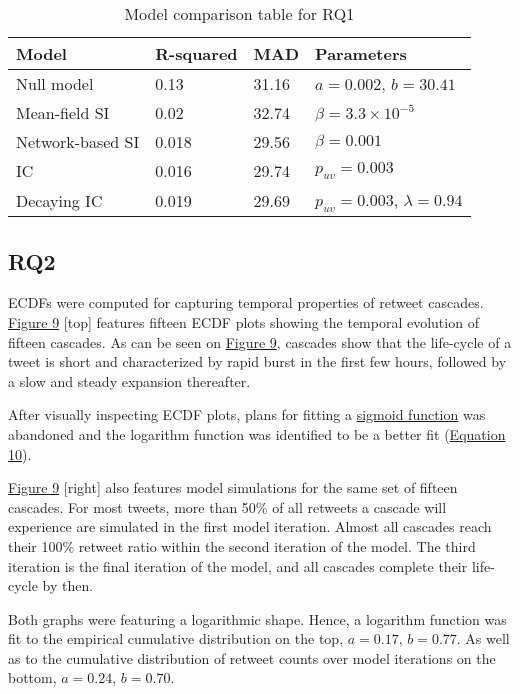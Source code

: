 \documentclass[11pt,a4paper]{article}
\begin{document}
    \begin{table}[H]
        \hypertarget{tab:comp}{}
      \centering
      \begin{tabular}{|l|l|l|l|}
        \hline
        \textbf{Model} & \textbf{R-squared} & \textbf{MAD}  & \textbf{Parameters} \\
        \hline
        Null model    & 0.13 & 31.16 & $a = 0.002$, $b = 30.41$  \\
        Mean-field SI & 0.02 & 32.74 & $\beta = 3.3 \times 10^{-5}$ \\
        Network-based SI & 0.018 & 29.56 & $\beta=0.001$ \\
        IC               & 0.016 & 29.74 & $p_{uv} = 0.003$  \\
        Decaying IC      & 0.019 & 29.69 & $p_{uv} = 0.003$, $\lambda = 0.94 $ \\
        \hline
      \end{tabular}
      \caption{Model comparison table for RQ1}
      \label{tab:mytable}
    \end{table}

    \subsection{RQ2}
    ECDFs were computed for capturing temporal properties of retweet cascades. \hyperlink{fig:ecdf-vs-iter}{Figure 9} [top] features fifteen ECDF plots showing the temporal evolution of fifteen cascades. As can be seen on \hyperlink{fig:ecdf-vs-iter}{Figure 9}, cascades show that the life-cycle of a tweet is short and characterized by rapid burst in the first few hours, followed by a slow and steady expansion thereafter.
    
    After visually inspecting ECDF plots, plans for fitting a \hyperlink{sec:sigmoid}{sigmoid function} was abandoned and the logarithm function was identified to be a better fit (\hyperlink{eq:avrami}{Equation 10}). 
    
    \hyperlink{fig:ecdf-vs-iter}{Figure 9} [right] also features model simulations for the same set of fifteen cascades. For most tweets, more than 50\% of all retweets a cascade will experience are simulated in the first model iteration. Almost all cascades reach their 100\% retweet ratio within the second iteration of the model. The third iteration is the final iteration of the model, and all cascades complete their life-cycle by then.

    Both graphs were featuring a logarithmic shape. Hence, a logarithm function was fit to the empirical cumulative distribution on the top,  $a = 0.17$, $b =  0.77$. As well as to the cumulative distribution of retweet counts over model iterations on the bottom, $a = 0.24$, $b =  0.70$.
\end{document}
